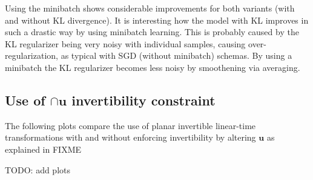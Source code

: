 Using the minibatch shows considerable improvements for both variants (with and without KL
divergence).  It is interesting how the model with KL improves in such a drastic way
by using minibatch learning. This is probably caused by the KL regularizer being
very noisy with individual samples, causing over-regularization, as typical with SGD
(without minibatch) schemas. By using a minibatch
the KL regularizer becomes less noisy by smoothening via averaging. 

\subsection{Use of $\cap{\mathbf{u}}$ invertibility constraint}

The following plots compare the use of planar invertible linear-time transformations
with and without enforcing invertibility by altering $\mathbf{u}$ as
explained in FIXME

TODO: add plots
